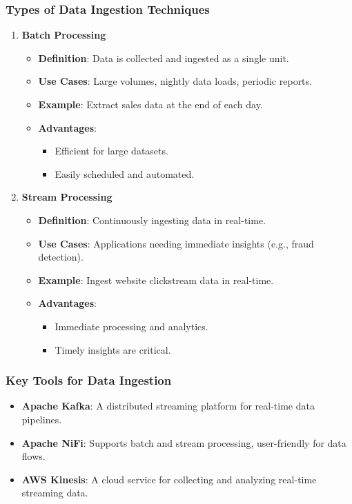 \documentclass{beamer}
\begin{document}
\begin{frame}
    \frametitle{Types of Data Ingestion Techniques}
    \begin{enumerate}
        \item \textbf{Batch Processing}
            \begin{itemize}
                \item \textbf{Definition}: Data is collected and ingested as a single unit.
                \item \textbf{Use Cases}: Large volumes, nightly data loads, periodic reports.
                \item \textbf{Example}: Extract sales data at the end of each day.
                \item \textbf{Advantages}:
                    \begin{itemize}
                        \item Efficient for large datasets.
                        \item Easily scheduled and automated.
                    \end{itemize}
            \end{itemize}

        \item \textbf{Stream Processing}
            \begin{itemize}
                \item \textbf{Definition}: Continuously ingesting data in real-time.
                \item \textbf{Use Cases}: Applications needing immediate insights (e.g., fraud detection).
                \item \textbf{Example}: Ingest website clickstream data in real-time.
                \item \textbf{Advantages}:
                    \begin{itemize}
                        \item Immediate processing and analytics.
                        \item Timely insights are critical.
                    \end{itemize}
            \end{itemize}
    \end{enumerate}
\end{frame}

\begin{frame}
    \frametitle{Key Tools for Data Ingestion}
    \begin{itemize}
        \item \textbf{Apache Kafka}: A distributed streaming platform for real-time data pipelines.
        \item \textbf{Apache NiFi}: Supports batch and stream processing, user-friendly for data flows.
        \item \textbf{AWS Kinesis}: A cloud service for collecting and analyzing real-time streaming data.
    \end{itemize}
\end{frame}
\end{document}
